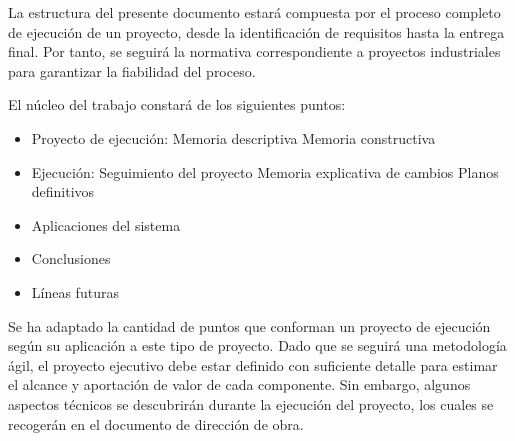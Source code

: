 La estructura del presente documento estará compuesta por el proceso completo de ejecución de un proyecto, desde la identificación de requisitos hasta la entrega final. Por tanto, se seguirá la normativa correspondiente a proyectos industriales para garantizar la fiabilidad del proceso.

El núcleo del trabajo constará de los siguientes puntos:
\begin{itemize}
    \item Proyecto de ejecución:
    \subitem Memoria descriptiva
    \subitem Memoria constructiva
    \item Ejecución:
    \subitem Seguimiento del proyecto
    \subitem Memoria explicativa de cambios
    \subitem Planos definitivos
    \item Aplicaciones del sistema
    \item Conclusiones
    \item Líneas futuras
\end{itemize}


Se ha adaptado la cantidad de puntos que conforman un proyecto de ejecución según su aplicación a este tipo de proyecto. Dado que se seguirá una metodología ágil, el proyecto ejecutivo debe estar definido con suficiente detalle para estimar el alcance y aportación de valor de cada componente. Sin embargo, algunos aspectos técnicos se descubrirán durante la ejecución del proyecto, los cuales se recogerán en el documento de dirección de obra.